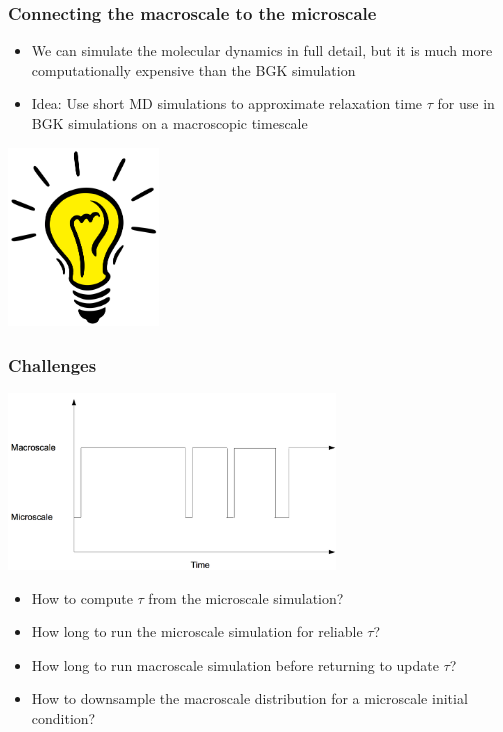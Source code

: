 \documentclass{beamer}
\begin{document}
\begin{frame}
\frametitle{Connecting the macroscale to the microscale}
\begin{itemize}
\item We can simulate the molecular dynamics in full detail, but it is much more computationally expensive than the BGK simulation\end{itemize}



\begin{itemize}
\item Idea: Use short MD simulations to approximate relaxation time $\tau$ for use in BGK simulations on a macroscopic timescale
\end{itemize}
\begin{center}\includegraphics[width=0.3\textwidth]{lightbulb.jpg}\end{center}
\end{frame}



\begin{frame}
\frametitle{Challenges}
\hspace*{3.5em}\includegraphics[width=0.65\textwidth]{scheme.png}
\begin{itemize}
\item How to compute $\tau$ from the microscale simulation?
\item How long to run the microscale simulation for reliable $\tau$?
\item How long to run macroscale simulation before returning to update $\tau$?
\item How to downsample the macroscale distribution for a microscale initial condition?
\end{itemize}
\end{frame}
\end{document}
